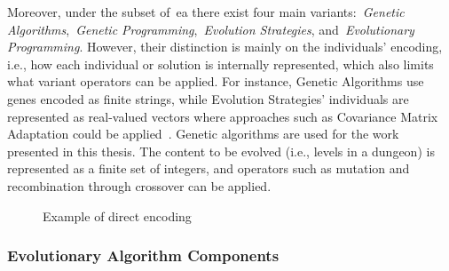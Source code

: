 
Moreover, under the subset of~\acrshort{ea} there exist four main variants:~\emph{Genetic Algorithms},~\emph{Genetic Programming},~\emph{Evolution Strategies}, and~\emph{Evolutionary Programming}. However, their distinction is mainly on the individuals' encoding, i.e., how each individual or solution is internally represented, which also limits what variant operators can be applied. For instance, Genetic Algorithms use genes encoded as finite strings, while Evolution Strategies' individuals are represented as real-valued vectors where approaches such as Covariance Matrix Adaptation could be applied~\cite{fontaine_covariance_2019}. Genetic algorithms are used for the work presented in this thesis. The content to be evolved (i.e., levels in a dungeon) is represented as a finite set of integers, and operators such as mutation and recombination through crossover can be applied.

\begin{figure}
    \centering
     \hfill
    
    \caption{Example of direct encoding}
    \label{fig:directENCOD}
\end{figure}

\subsubsection{Evolutionary Algorithm Components}

